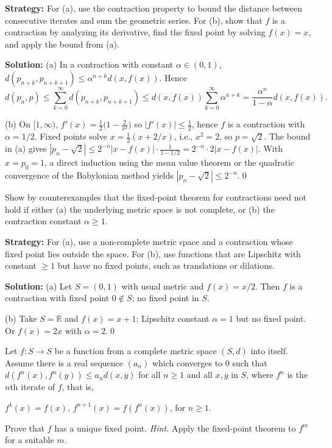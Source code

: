 \noindent\textbf{Strategy:} For (a), use the contraction property to bound the distance between consecutive iterates and sum the geometric series. For (b), show that $f$ is a contraction by analyzing its derivative, find the fixed point by solving $f(x) = x$, and apply the bound from (a).

\bigskip\noindent\textbf{Solution:}
(a) In a contraction with constant $\alpha\in(0,1)$, $d(p_{n+k},p_{n+k+1})\le \alpha^{n+k}d(x,f(x))$. Hence
\[
d(p_n,p)\le \sum_{k=0}^{\infty} d(p_{n+k},p_{n+k+1})\le d(x,f(x))\sum_{k=0}^{\infty}\alpha^{n+k}=\frac{\alpha^n}{1-\alpha}d(x,f(x)).
\]

(b) On $[1,\infty)$, $f'(x)=\tfrac12\big(1-\tfrac{2}{x^2}\big)$ so $|f'(x)|\le \tfrac12$, hence $f$ is a contraction with $\alpha=1/2$. Fixed points solve $x=\tfrac12(x+2/x)$, i.e., $x^2=2$, so $p=\sqrt2$. The bound in (a) gives $|p_n-\sqrt2|\le 2^{-n}|x-f(x)|\cdot\tfrac{1}{1-1/2}=2^{-n}\cdot 2|x-f(x)|$. With $x=p_0=1$, a direct induction using the mean value theorem or the quadratic convergence of the Babylonian method yields $|p_n-\sqrt2|\le 2^{-n}$.\qed



\begin{problembox}
Show by counterexamples that the fixed-point theorem for contractions need not hold if either (a) the underlying metric space is not complete, or (b) the contraction constant $\alpha \ge 1$.
\end{problembox}

\noindent\textbf{Strategy:} For (a), use a non-complete metric space and a contraction whose fixed point lies outside the space. For (b), use functions that are Lipschitz with constant $\geq 1$ but have no fixed points, such as translations or dilations.

\bigskip\noindent\textbf{Solution:}
(a) Let $S=(0,1)$ with usual metric and $f(x)=x/2$. Then $f$ is a contraction with fixed point $0\notin S$; no fixed point in $S$.

(b) Take $S=\mathbb{R}$ and $f(x)=x+1$; Lipschitz constant $\alpha=1$ but no fixed point. Or $f(x)=2x$ with $\alpha=2$.\qed



\begin{problembox}
Let $f: S \to S$ be a function from a complete metric space $(S, d)$ into itself. Assume there is a real sequence $(a_n)$ which converges to $0$ such that $d(f^n(x), f^n(y)) \le a_n d(x, y)$ for all $n \ge 1$ and all $x, y$ in $S$, where $f^n$ is the $n$th iterate of $f$, that is, 

$f^1(x) = f(x)$, $f^{n+1}(x) = f(f^n(x))$, for $n \ge 1$. 

Prove that $f$ has a unique fixed point. \textit{Hint.} Apply the fixed-point theorem to $f^m$ for a suitable $m$.
\end{problembox}


